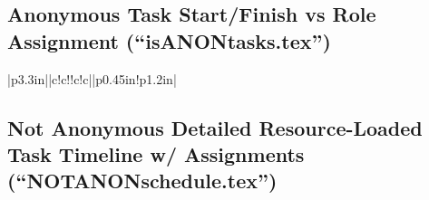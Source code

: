 \documentclass[usenames,dvipsnames,modern]{CLASS_FILES/aastex631}
\begin{document}
\newpage
\subsection{\textbf{Anonymous} Task Start/Finish vs Role Assignment (``isANONtasks.tex'')}
\addtocounter{table}{-1} %
\begin{table}[h!] %
   \renewcommand{\arraystretch}{0.7} %
   \setlength{\tabcolsep}{5pt} %
   \begin{longtable}{|p{3.3in}||c!{\color{lightgray}\vrule}c!{\color{lightgray}\vrule}!{\color{lightgray}\vrule}c!{\color{lightgray}\vrule}c||p{0.45in}!{\color{lightgray}\vrule}p{1.2in}|}
   \end{longtable}
   \caption{\label{tab:isANONtasks} \textbf{Task Timeline:} Team member roles, rightmost column, are cross-referenced with corresponding names in the non-anonymized personnel and work effort table.  {\color{red} \textbf{Paper~1:} Sample and methods for enhancing detectability of  low SB X-ray emission, presentation of emission maps, description of database and pipeline software (which will be released in a public repository at the time of paper submission). \textbf{Paper~2:} Methodologies for measuring the gas halo size and other gas properties, analyisis of the diffuse hot gas halos as functions of galaxy properties (environment, galaxy morphology, stellar mass, and SFR based on \Chandra, \Hubble, and \Spitzer\ observations, and the SED models from the GSWLC; application of multivariate mthods to ``baseline'' the gas halo sizes (Sect.\,\ref{Sec:Baseline}). \textbf{Note~1:} See Sec.\,\ref{Sec:Sample}.}}
\end{table}

\newpage
\subsection{\textbf{Not} Anonymous Detailed Resource-Loaded Task Timeline w/ Assignments (``NOTANONschedule.tex'')}
\end{document}
